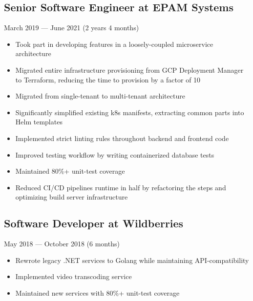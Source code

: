 \documentclass[a4paper,11pt]{article}
\begin{document}
\subsection{Senior Software Engineer at EPAM Systems}
March 2019 --- June 2021 (2 years 4 months)
\begin{itemize}[noitemsep]
    \renewcommand{\labelitemi}{---}

    \item Took part in developing features in a loosely-coupled microservice architecture
    \item Migrated entire infrastructure provisioning from GCP Deployment Manager to Terraform, reducing the time to provision by a factor of 10
    \item Migrated from single-tenant to multi-tenant architecture
    \item Significantly simplified existing k8s manifests, extracting common parts into Helm templates
    \item Implemented strict linting rules throughout backend and frontend code
    \item Improved testing workflow by writing containerized database tests
    \item Maintained 80\%+ unit-test coverage
    \item Reduced CI/CD pipelines runtime in half by refactoring the steps and optimizing build server infrastructure
\end{itemize}

\subsection{Software Developer at Wildberries}
May 2018 --- October 2018 (6 months)
\begin{itemize}[noitemsep]
    \renewcommand{\labelitemi}{---}

    \item Rewrote legacy .NET services to Golang while maintaining API-compatibility
    \item Implemented video transcoding service
    \item Maintained new services with 80\%+ unit-test coverage
\end{itemize}
\end{document}
